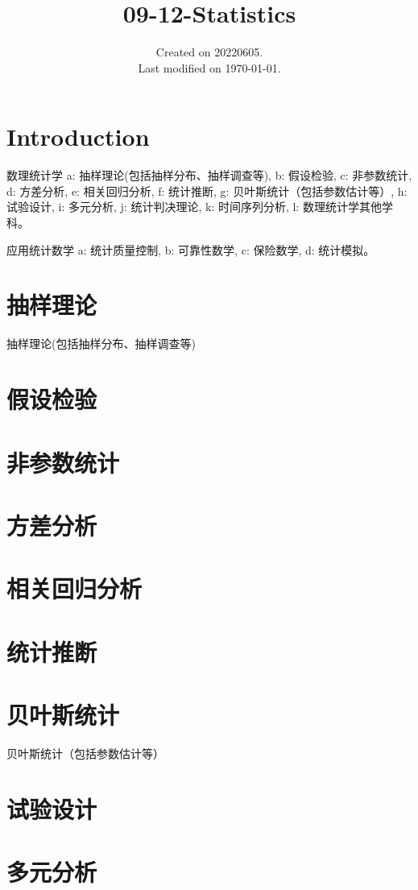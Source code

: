 \documentclass[UTF8]{../09-Mathematics}
\begin{document}
\title{09-12-Statistics}
\date{Created on 20220605.\\   Last modified on \today.}
\maketitle
\tableofcontents


\chapter{Introduction}



数理统计学
a: 抽样理论(包括抽样分布、抽样调查等), 
b: 假设检验, 
c: 非参数统计, 
d: 方差分析, 
e: 相关回归分析, 
f: 统计推断, 
g: 贝叶斯统计（包括参数估计等）, 
h: 试验设计, 
i: 多元分析, 
j: 统计判决理论, 
k: 时间序列分析, 
l: 数理统计学其他学科。

应用统计数学
a: 统计质量控制, b: 可靠性数学, c: 保险数学, d: 统计模拟。




\chapter{抽样理论}
抽样理论(包括抽样分布、抽样调查等)
\chapter{假设检验}
\chapter{非参数统计}
\chapter{方差分析}
\chapter{相关回归分析}
\chapter{统计推断}
\chapter{贝叶斯统计}
贝叶斯统计（包括参数估计等）
\chapter{试验设计}
\chapter{多元分析}
\end{document}
